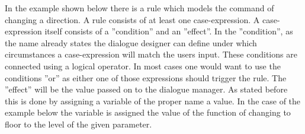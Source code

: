 \documentclass[a4paper, 12pt]{article}
\begin{document}
In the example shown below there is a rule which models the command of changing a direction.
A rule consists of at least one case-expression.
A case-expression itself consists of a ”condition” and an ”effect”.
 In the ”condition”, as the name already states the dialogue designer can define under which circumstances a case-expression will match the users input.
 These conditions are connected using a logical operator.
 In most cases one would want to use the conditions ”or” as either one of those expressions should trigger the rule.
 The ”effect” will be the value passed on to the dialogue manager.  
 As stated before this is done by assigning a variable of the proper name a value.
 In the case of the example below the variable is assigned the value of the function of changing to floor to the level of the given parameter. 
\end{document}
